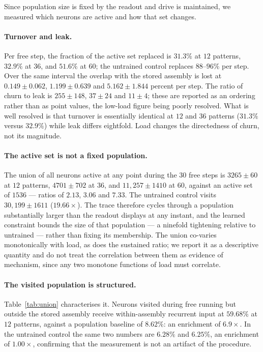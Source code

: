 \documentclass[10pt,twocolumn,a4paper]{article}
\newcommand{\pct}{\%}
\begin{document}
Since population size is fixed by the readout and drive is maintained, we measured which
neurons are active and how that set changes.

\paragraph{Turnover and leak.}
Per free step, the fraction of the active set replaced is $31.3\pct$ at $12$ patterns,
$32.9\pct$ at $36$, and $51.6\pct$ at $60$; the untrained control replaces $88$--$96\pct$
per step. Over the same interval the overlap with the stored assembly is lost at
$0.149 \pm 0.062$, $1.199 \pm 0.639$ and $5.162 \pm 1.844$ percent per step. The ratio of
churn to leak is $255 \pm 148$, $37 \pm 24$ and $11 \pm 4$; these are reported as an
ordering rather than as point values, the low-load figure being poorly resolved. What is
well resolved is that turnover is essentially identical at $12$ and $36$ patterns
($31.3\pct$ versus $32.9\pct$) while leak differs eightfold. Load changes the directedness
of churn, not its magnitude.

\paragraph{The active set is not a fixed population.}
The union of all neurons active at any point during the $30$ free steps is $3265 \pm 60$
at $12$ patterns, $4701 \pm 702$ at $36$, and $11{,}257 \pm 1410$ at $60$, against an
active set of $1536$ --- ratios of $2.13$, $3.06$ and $7.33$. The untrained control visits
$30{,}199 \pm 1611$ ($19.66\times$). The trace therefore cycles through a population
substantially larger than the readout displays at any instant, and the learned constraint
bounds the size of that population --- a ninefold tightening relative to untrained ---
rather than fixing its membership. The union co-varies monotonically with load, as does
the sustained ratio; we report it as a descriptive quantity and do not treat the
correlation between them as evidence of mechanism, since any two monotone functions of
load must correlate.

\paragraph{The visited population is structured.}
Table~\ref{tab:union} characterises it. Neurons visited during free running but outside
the stored assembly receive within-assembly recurrent input at $59.68\pct$ at $12$
patterns, against a population baseline of $8.62\pct$: an enrichment of $6.9\times$. In
the untrained control the same two numbers are $6.28\pct$ and $6.25\pct$, an enrichment of
$1.00\times$, confirming that the measurement is not an artifact of the procedure.
\end{document}

